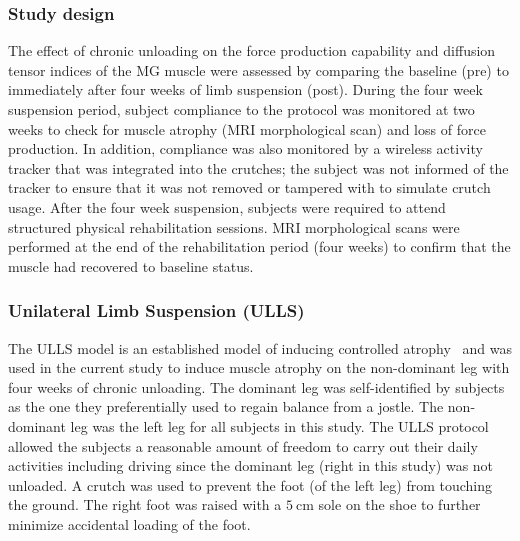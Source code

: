 \subsubsection{Study design} 
The effect of chronic unloading on the force production capability and diffusion tensor indices of the MG muscle were assessed by comparing the baseline (pre) to immediately after four weeks of limb suspension (post).
During the four week suspension period, subject compliance to the protocol was monitored at two weeks to check for muscle atrophy (MRI morphological scan) and loss of force production.
In addition, compliance was also monitored by a wireless activity tracker that was integrated into the crutches; the subject was not informed of the tracker to ensure that it was not removed or tampered with to simulate crutch usage.
After the four week suspension, subjects were required to attend structured physical rehabilitation sessions.
MRI morphological scans were performed at the end of the rehabilitation period (four weeks) to confirm that the muscle had recovered to baseline status.
\subsubsection{Unilateral Limb Suspension (ULLS)}
The ULLS model is an established model of inducing controlled atrophy~\cite{RNS19} and was used in the current study to induce muscle atrophy on the non-dominant leg with four weeks of chronic unloading.
The dominant leg was self-identified by subjects as the one they preferentially used to regain balance from a jostle.
The non-dominant leg was the left leg for all subjects in this study.
The ULLS protocol allowed the subjects a reasonable amount of freedom to carry out their daily activities including driving since the dominant leg (right in this study) was not unloaded.
A crutch was used to prevent the foot (of the left leg) from touching the ground.
The right foot was raised with a $\SI{5}{\centi\meter}$ sole on the shoe to further minimize accidental loading of the foot.
